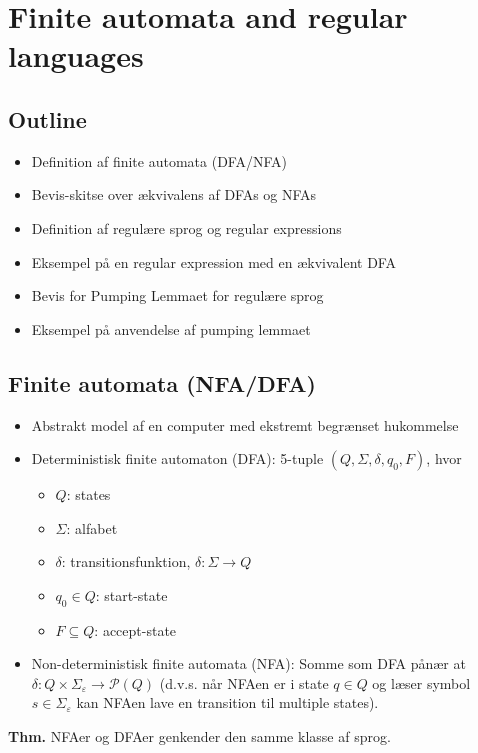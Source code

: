 \section{Finite automata and regular languages}

\subsection*{Outline}

\begin{itemize}
    \item Definition af finite automata (DFA/NFA)
    \item Bevis-skitse over ækvivalens af DFAs og NFAs
    \item Definition af regulære sprog og regular expressions
    \item Eksempel på en regular expression med en ækvivalent DFA
    \item Bevis for Pumping Lemmaet for regulære sprog
    \item Eksempel på anvendelse af pumping lemmaet 
\end{itemize}

\subsection*{Finite automata (NFA/DFA)}

\begin{itemize}
    \item Abstrakt model af en computer med ekstremt begrænset hukommelse
    \item Deterministisk finite automaton (DFA): 5-tuple $(Q,\Sigma,\delta,q_0,F)$, hvor
    \begin{itemize}
        \item $Q$: states 
        \item $\Sigma$: alfabet 
        \item $\delta$: transitionsfunktion, $\delta: \Sigma \rightarrow Q$
        \item $q_0 \in Q$: start-state 
        \item $F \subseteq Q$: accept-state 
    \end{itemize}
    \item Non-deterministisk finite automata (NFA): Somme som DFA pånær at $\delta: Q \times \Sigma_{\varepsilon} \rightarrow \mathcal{P}(Q)$ (d.v.s. når NFAen er i state $q \in Q$ og læser symbol $s \in \Sigma_{\varepsilon}$ kan NFAen lave en transition til multiple states).
\end{itemize}
\textbf{Thm.} NFAer og DFAer genkender den samme klasse af sprog. \\

